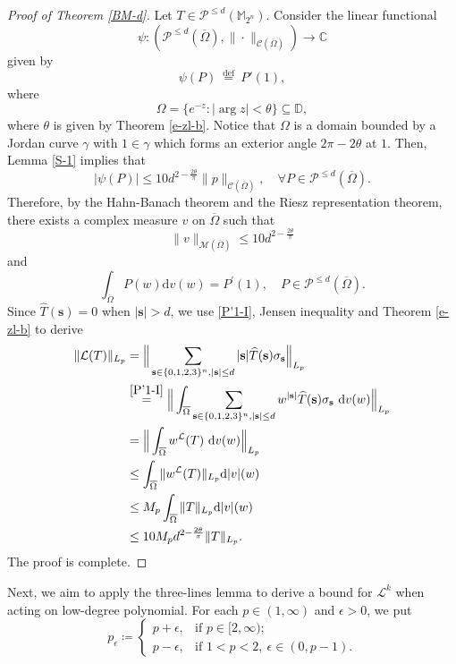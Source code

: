 \documentclass{amsbook}
\theoremstyle{definition}
\theoremstyle{remark}
\numberwithin{section}{chapter}
\numberwithin{equation}{chapter}
\newcommand{\1}{\mathbf{1}}
\begin{document}
\begin{proof}[Proof of Theorem \ref{BM-d}]
Let $T\in \mathcal{P}^{\leq d}(\mathbb{M}_{2^n})$.
Consider the linear functional
$$\psi:(\mathcal{P}^{\leq d}(\overline{\Omega}),\|\cdot\|_{\mathcal{C}(\overline{\Omega})}) \rightarrow \mathbb{C}
$$
given by
$$
\psi(P) \stackrel{\text { def }}{=} P'(1),
$$
where 
$$\Omega=\{e^{-z}:|\arg z|<\theta\} \subseteq \mathbb{D},$$ 
where $\theta$ is given by Theorem \ref{e-zl-b}.
 Notice that $\Omega$ is a domain bounded by a Jordan curve $\gamma$ with $1 \in \gamma$ which forms an exterior angle $2 \pi-2 \theta$ at $1$. Then, Lemma \ref{S-1} implies that 
$$|\psi(P)| \leq 10 d^{2-\frac{2 \theta}{\pi}}\|p\|_{\mathcal{C}(\overline{\Omega})},\quad \forall P \in \mathcal{P}^{\leq d}(\overline{\Omega}).
$$
Therefore, by the Hahn-Banach theorem and the Riesz representation theorem, there exists a complex measure $v$ on $\overline{\Omega}$ such that 
$$\|v\|_{\mathcal{M}(\overline{\Omega})} \leq 10 d^{2-\frac{2 \theta}{\pi}}$$ 
and 
\begin{equation}\label{P'1-I}
\int_{\overline{\Omega}} P(w) \mathrm{d} v(w)=P^{\prime}(1),\quad P\in\mathcal{P}^{\leq d}(\overline{\Omega}).
\end{equation}
Since $\widehat{T}(\mathbf{s})=0$ when $|\mathbf{s}|>d$, we use \eqref{P'1-I}, Jensen inequality and Theorem \ref{e-zl-b} to derive
\begin{align*}
\|\mathcal{L}(T)\|_{L_{p}} 
&=\Big\|\sum_{\mathbf{s}\in\{0,1,2,3\}^n,|\mathbf{s}|\leq d} |\mathbf{s}|\widehat{T}(\mathbf{s}) \sigma_{\mathbf{s}}\Big\|_{L_{p}}\\
&\stackrel{\eqref{P'1-I}}{=}\Big\|\int_{\overline{\Omega}}\sum_{\mathbf{s}\in\{0,1,2,3\}^n,|\mathbf{s}|\leq d}w^{|\mathbf{s}|}\widehat{T}(\mathbf{s}) \sigma_{\mathbf{s}}\mathrm{~d} v(w)\Big\|_{L_{p}}\\
&=\Big\|\int_{\overline{\Omega}}w^{\mathcal{L}} (T) \mathrm{~d} v(w)\Big\|_{L_{p}} \\
&\leq \int_{\overline{\Omega}}\|w^{\mathcal{L}} (T)\|_{L_{p}} \mathrm{d}|v|(w) \\
& \leq M_p \int_{\overline{\Omega}}\|T\|_{L_{p}} \mathrm{d}|v|(w) \\
& \leq 10 M_pd^{2-\frac{2\theta}{\pi}}\|T\|_{L_{p}}.
\end{align*}
 The proof is complete.
\end{proof}


Next, we aim to apply the three-lines lemma to derive a bound for $\mathcal{L}^{k}$ when acting on low-degree polynomial. For each $p\in (1,\infty)$ and $\epsilon>0$, we put
\[
p_{\epsilon}\coloneqq
\begin{cases}
p+\epsilon,&\mbox{if }p\in[2,\infty);\\
p-\epsilon,&\mbox{if }1<p<2,~\epsilon\in(0,p-1).
\end{cases}
\]
\end{document}
